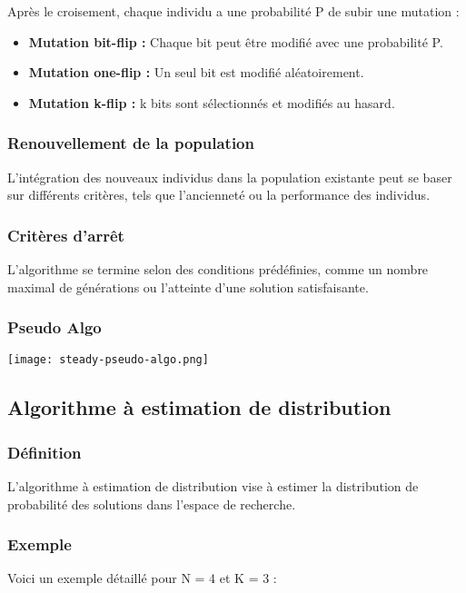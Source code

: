 \documentclass{article}
\begin{document}
Après le croisement, chaque individu a une probabilité P de subir une mutation :

\begin{itemize}
    \item \textbf{Mutation bit-flip :} Chaque bit peut être modifié avec une probabilité P.
    \item \textbf{Mutation one-flip :} Un seul bit est modifié aléatoirement.
    \item \textbf{Mutation k-flip :} k bits sont sélectionnés et modifiés au hasard.
\end{itemize}

\subsubsection{Renouvellement de la population}

L'intégration des nouveaux individus dans la population existante peut se baser sur différents critères, tels que l'ancienneté ou la performance des individus.

\subsubsection{Critères d'arrêt}

L'algorithme se termine selon des conditions prédéfinies, comme un nombre maximal de générations ou l'atteinte d'une solution satisfaisante.


\subsubsection{Pseudo Algo}

\texttt{[image: steady-pseudo-algo.png]}

\subsection{Algorithme à estimation de distribution}
\subsubsection{Définition}
L'algorithme à estimation de distribution vise à estimer la distribution de probabilité des solutions dans l'espace de recherche.

\subsubsection{Exemple}
Voici un exemple détaillé pour N = 4 et K = 3 :
\end{document}
